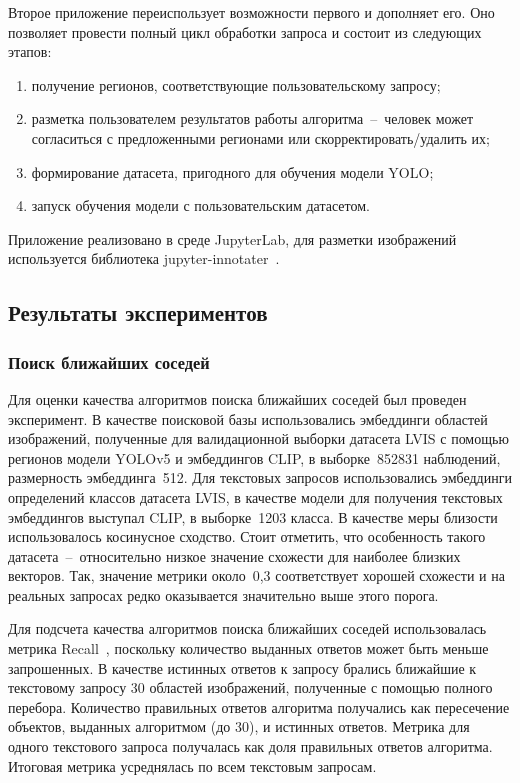 \documentclass[a4paper,14pt]{article}
\begin{document}
    Второе приложение переиспользует возможности первого и дополняет его.
    Оно позволяет провести полный цикл обработки запроса и состоит из следующих этапов:
   	\begin{enumerate}
    	[1)]
    	\itemsep0em
    	\item получение регионов, соответствующие пользовательскому запросу;
    	\item разметка пользователем результатов работы алгоритма~--~человек может согласиться с предложенными регионами или скорректировать/удалить их;
    	\item формирование датасета, пригодного для обучения модели YOLO;
    	\item запуск обучения модели с пользовательским датасетом.
    \end{enumerate}

	Приложение реализовано в среде JupyterLab, для разметки изображений используется библиотека jupyter-innotater~\cite{jupyter_innotater}.

    \subsection{Результаты экспериментов}

    \subsubsection{Поиск ближайших соседей}

    Для оценки качества алгоритмов поиска ближайших соседей был проведен эксперимент.
    В качестве поисковой базы использовались эмбеддинги областей изображений, полученные для валидационной выборки датасета LVIS с помощью регионов модели YOLOv5 и эмбеддингов CLIP, в выборке~852831 наблюдений, размерность эмбеддинга~512.
    Для текстовых запросов использовались эмбеддинги определений классов датасета LVIS, в качестве модели для получения текстовых эмбеддингов выступал CLIP, в выборке~1203 класса.
    В качестве меры близости использовалось косинусное сходство.
    Стоит отметить, что особенность такого датасета~--~относительно низкое значение схожести для наиболее близких векторов.
    Так, значение метрики около~0,3 соответствует хорошей схожести и на реальных запросах редко оказывается значительно выше этого порога.

    Для подсчета качества алгоритмов поиска ближайших соседей использовалась метрика Recall~\cite{aumuller2020ann}, поскольку количество выданных ответов может быть меньше запрошенных.
    В качестве истинных ответов к запросу брались ближайшие к текстовому запросу 30 областей изображений, полученные с помощью полного перебора.
    Количество правильных ответов алгоритма получались как пересечение объектов, выданных алгоритмом (до 30), и истинных ответов.
    Метрика для одного текстового запроса получалась как доля правильных ответов алгоритма.
    Итоговая метрика усреднялась по всем текстовым запросам.
\end{document}
